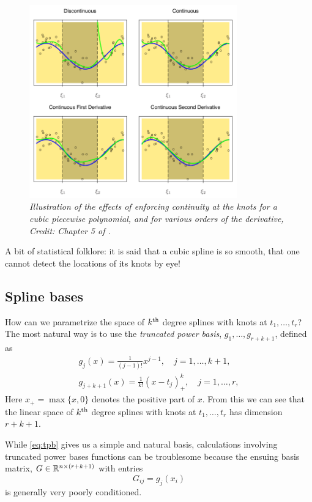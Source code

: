 \documentclass{article}
\begin{document}
\begin{figure}[tb]
\centering
\includegraphics[width=0.8\textwidth]{splines.pdf}
\caption{\it Illustration of the effects of enforcing continuity at the knots
  for a cubic piecewise polynomial, and for various orders of the derivative,
  Credit: Chapter 5 of \citet{hastie2009elements}.}    
\label{fig:splines}
\end{figure}

A bit of statistical folklore: it is said that a cubic spline is so smooth, that
one cannot detect the locations of its knots by eye! 

\subsection{Spline bases}

How can we parametrize the space of $k^{\text{th}}$ degree splines with knots at 
$t_1,\dots,t_r$?  The most natural way is to use the \emph{truncated power
  basis}, $g_1, \dots, g_{r+k+1}$, defined as   
\begin{equation}
\begin{gathered}
\label{eq:tpb}
g_j(x) = \frac{1}{(j-1)!} x^{j-1}, \quad j=1,\dots,k+1, \\
g_{j+k+1}(x) = \frac{1}{k!} (x-t_j)^k_+, \quad j=1,\dots,r,
\end{gathered}
\end{equation}
Here $x_+=\max\{x,0\}$ denotes the positive part of $x$. From this we can see
that the linear space of $k^{\text{th}}$ degree splines with knots at $t_1,\dots,t_r$ has 
dimension $r+k+1$.

While \eqref{eq:tpb} gives us a simple and natural basis, calculations involving
truncated power bases functions can be troublesome because the ensuing basis 
matrix, $G \in \mathbb{R}^{n \times (r+k+1)}$ with entries
\[
G_{ij} = g_j(x_i)
\]
is generally very poorly conditioned.
\end{document}
